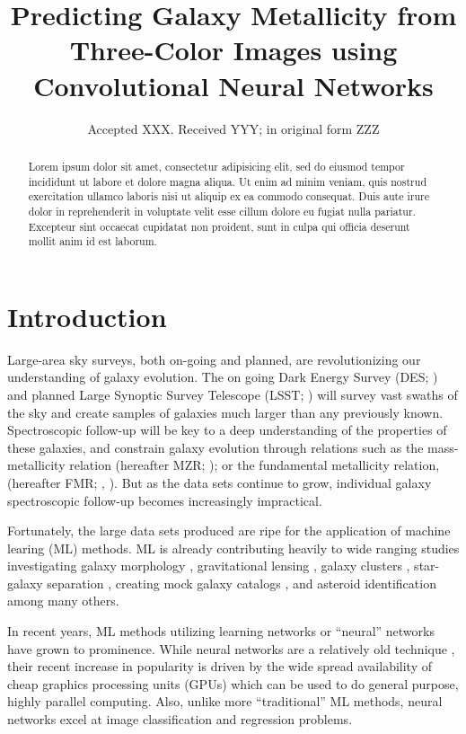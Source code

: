 \documentclass[fleqn,usenatbib]{mnras}
\title[Metallicity with CNNs]{Predicting Galaxy Metallicity from Three-Color Images using Convolutional Neural Networks}
\author[Wu and Boada]
{\parbox{\textwidth}{John~Wu$^{1}$\thanks{E-mail: \href{mailto:jw740@physics.rutgers.edu}} and
Steven~Boada$^{1}$}\vspace{0.4cm}\
\\
\parbox{\textwidth}{$^{1}$Physics and Astronomy Department, Rutgers University, Piscataway, NJ 08854-8019, USA\\}}
\date{Accepted XXX. Received YYY; in original form ZZZ}
\begin{document}
\label{firstpage}
\pagerange{\pageref{firstpage}--\pageref{lastpage}}
\maketitle

\begin{abstract}
\noindent
Lorem ipsum dolor sit amet, consectetur adipisicing elit, sed do eiusmod tempor incididunt ut labore et dolore magna aliqua. Ut enim ad minim veniam, quis nostrud exercitation ullamco laboris nisi ut aliquip ex ea commodo consequat. Duis aute irure dolor in reprehenderit in voluptate velit esse cillum dolore eu fugiat nulla pariatur. Excepteur sint occaecat cupidatat non proident, sunt in culpa qui officia deserunt mollit anim id est laborum.
\end{abstract}

\section{Introduction}\label{sec:introduction}
Large-area sky surveys, both on-going and planned, are revolutionizing our understanding of galaxy evolution. The on going Dark Energy Survey (DES; \citealt{DES2005}) and planned Large Synoptic Survey Telescope (LSST; \citealt{LSST2012}) will survey vast swaths of the sky and create samples of galaxies much larger than any previously known. Spectroscopic follow-up will be key to a deep understanding of the properties of these galaxies, and constrain galaxy evolution through relations such as the mass-metallicity relation (hereafter MZR; \citealt{Tremonti2004}); or the fundamental metallicity relation, (hereafter FMR; \eg, \citealt{Mannucci2010}). But as the data sets continue to grow, individual galaxy spectroscopic follow-up becomes increasingly impractical.

Fortunately, the large data sets produced are ripe for the application of machine learing (ML) methods. ML is already contributing heavily to wide ranging studies investigating galaxy morphology , gravitational lensing , galaxy clusters , star-galaxy separation , creating mock galaxy catalogs , and asteroid identification  among many others.

In recent years, ML methods utilizing learning networks or ``neural'' networks have grown to prominence. While neural networks are a relatively old technique , their recent increase in popularity is driven by the wide spread availability of cheap graphics processing units (GPUs) which can be used to do general purpose, highly parallel computing. Also, unlike more ``traditional'' ML methods, neural networks excel at image classification and regression problems.
\end{document}
